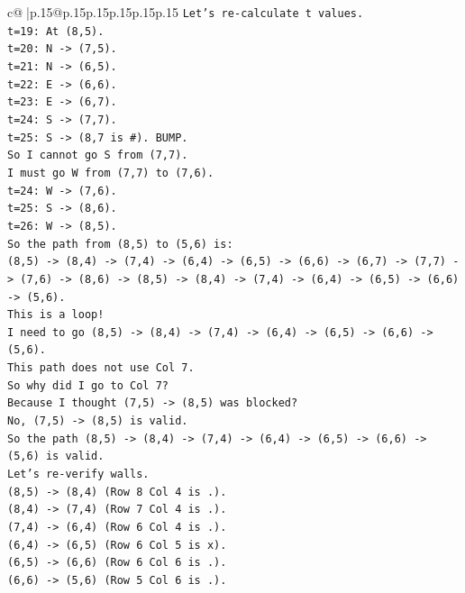 \documentclass{article}
\begin{document}
{\begin{supertabular}{c@{$\;$}|p{.15\linewidth}@{}p{.15\linewidth}p{.15\linewidth}p{.15\linewidth}p{.15\linewidth}p{.15\linewidth}}
{{{\texttt{Let's re{-}calculate t values.} \\
\texttt{t=19: At (8,5).} \\
\texttt{t=20: N {-}> (7,5).} \\
\texttt{t=21: N {-}> (6,5).} \\
\texttt{t=22: E {-}> (6,6).} \\
\texttt{t=23: E {-}> (6,7).} \\
\texttt{t=24: S {-}> (7,7).} \\
\texttt{t=25: S {-}> (8,7 is \#). BUMP.} \\
\texttt{So I cannot go S from (7,7).} \\
\texttt{I must go W from (7,7) to (7,6).} \\
\texttt{t=24: W {-}> (7,6).} \\
\texttt{t=25: S {-}> (8,6).} \\
\texttt{t=26: W {-}> (8,5).} \\
\texttt{So the path from (8,5) to (5,6) is:} \\
\texttt{(8,5) {-}> (8,4) {-}> (7,4) {-}> (6,4) {-}> (6,5) {-}> (6,6) {-}> (6,7) {-}> (7,7) {-}> (7,6) {-}> (8,6) {-}> (8,5) {-}> (8,4) {-}> (7,4) {-}> (6,4) {-}> (6,5) {-}> (6,6) {-}> (5,6).} \\
\texttt{This is a loop!} \\
\texttt{I need to go (8,5) {-}> (8,4) {-}> (7,4) {-}> (6,4) {-}> (6,5) {-}> (6,6) {-}> (5,6).} \\
\texttt{This path does not use Col 7.} \\
\texttt{So why did I go to Col 7?} \\
\texttt{Because I thought (7,5) {-}> (8,5) was blocked?} \\
\texttt{No, (7,5) {-}> (8,5) is valid.} \\
\texttt{So the path (8,5) {-}> (8,4) {-}> (7,4) {-}> (6,4) {-}> (6,5) {-}> (6,6) {-}> (5,6) is valid.} \\
\texttt{Let's re{-}verify walls.} \\
\texttt{(8,5) {-}> (8,4) (Row 8 Col 4 is .).} \\
\texttt{(8,4) {-}> (7,4) (Row 7 Col 4 is .).} \\
\texttt{(7,4) {-}> (6,4) (Row 6 Col 4 is .).} \\
\texttt{(6,4) {-}> (6,5) (Row 6 Col 5 is x).} \\
\texttt{(6,5) {-}> (6,6) (Row 6 Col 6 is .).} \\
\texttt{(6,6) {-}> (5,6) (Row 5 Col 6 is .).} \\
}}}
\end{supertabular}}
\end{document}
